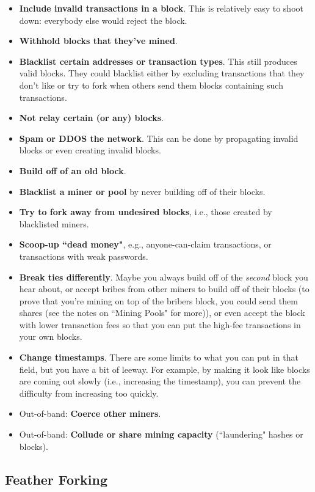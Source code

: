 \documentclass[12pt]{article}
\begin{document}
\begin{itemize}
\item \textbf{Include invalid transactions in a block}. This is relatively easy to shoot down: everybody else would reject the block.
\item \textbf{Withhold blocks that they've mined}.
\item \textbf{Blacklist certain addresses or transaction types}. This still produces valid blocks. They could blacklist either by excluding transactions that they don't like or try to fork when others send them blocks containing such transactions.
\item \textbf{Not relay certain (or any) blocks}.
\item \textbf{Spam or DDOS the network}. This can be done by propagating invalid blocks or even creating invalid blocks.
\item \textbf{Build off of an old block}.
\item \textbf{Blacklist a miner or pool} by never building off of their blocks.
\item \textbf{Try to fork away from undesired blocks}, i.e., those created by blacklisted miners.
\item \textbf{Scoop-up ``dead money"}, e.g., anyone-can-claim transactions, or transactions with weak passwords.
\item \textbf{Break ties differently}. Maybe you always build off of the \textit{second} block you hear about, or accept bribes from other miners to build off of their blocks (to prove that you're mining on top of the bribers block, you could send them shares (see the notes on ``Mining Pools" for more)), or even accept the block with lower transaction fees so that you can put the high-fee transactions in your own blocks.
\item \textbf{Change timestamps}. There are some limits to what you can put in that field, but you have a bit of leeway. For example, by making it look like blocks are coming out slowly (i.e., increasing the timestamp), you can prevent the difficulty from increasing too quickly.
\item Out-of-band: \textbf{Coerce other miners}.
\item Out-of-band: \textbf{Collude or share mining capacity} (``laundering" hashes or blocks).
\end{itemize}

\subsection*{Feather Forking}
\end{document}

